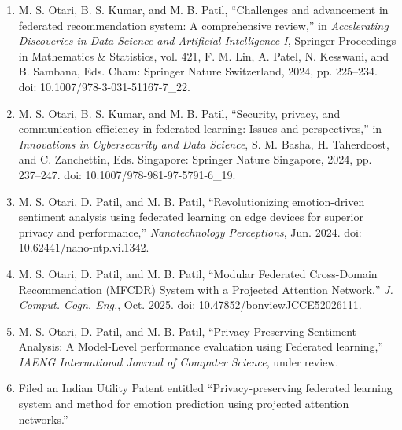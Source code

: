 \clearpage
\pubschapter

\noindent
\begin{enumerate}
\item M. S. Otari, B. S. Kumar, and M. B. Patil, ``Challenges and advancement in federated recommendation system: A comprehensive review,'' in \emph{Accelerating Discoveries in Data Science and Artificial Intelligence I}, Springer Proceedings in Mathematics \& Statistics, vol. 421, F. M. Lin, A. Patel, N. Kesswani, and B. Sambana, Eds. Cham: Springer Nature Switzerland, 2024, pp. 225--234. doi: 10.1007/978-3-031-51167-7\_22.

\item M. S. Otari, B. S. Kumar, and M. B. Patil, ``Security, privacy, and communication efficiency in federated learning: Issues and perspectives,'' in \emph{Innovations in Cybersecurity and Data Science}, S. M. Basha, H. Taherdoost, and C. Zanchettin, Eds. Singapore: Springer Nature Singapore, 2024, pp. 237--247. doi: 10.1007/978-981-97-5791-6\_19.

\item M. S. Otari, D. Patil, and M. B. Patil, ``Revolutionizing emotion-driven sentiment analysis using federated learning on edge devices for superior privacy and performance,'' \emph{Nanotechnology Perceptions}, Jun. 2024. doi: 10.62441/nano-ntp.vi.1342.

\item M. S. Otari, D. Patil, and M. B. Patil, ``Modular Federated Cross-Domain Recommendation (MFCDR) System with a Projected Attention Network,'' \emph{J. Comput. Cogn. Eng.}, Oct. 2025. doi: 10.47852/bonviewJCCE52026111.

\item M. S. Otari, D. Patil, and M. B. Patil, ``Privacy-Preserving Sentiment Analysis: A Model-Level performance evaluation using Federated learning,'' \emph{IAENG International Journal of Computer Science}, under review.

\item Filed an Indian Utility Patent entitled ``Privacy-preserving federated learning system and method for emotion prediction using projected attention networks.''
\end{enumerate}
